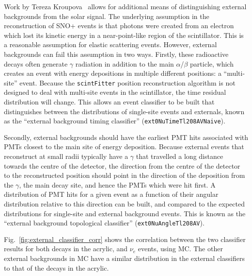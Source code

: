 Work by Tereza Kroupova~\cite{kroupovaImprovingSensitivityNeutrinoless2020} %
allows for additional means of distinguishing external backgrounds from the solar signal. The underlying assumption in the reconstruction of SNO+ events is that photons were created from an electron which lost its kinetic energy in a near-point-like region of the scintillator. This is a reasonable assumption for \beight{} elastic scattering events. However, external backgrounds can fail this assumption in two ways. Firstly, these radioactive decays often generate $\gamma$ radiation in addition to the main $\alpha$/$\beta$ particle, which creates an event with energy depositions in multiple different positions: a ``multi-site'' event. Because the \texttt{scintFitter} position reconstruction algorithm is not designed to deal with multi-site events in the scintillator, the time residual distribution will change. This allows an event classifier to be built that distinguishes between the \tres{} distributions of single-site events and externals, known as the ``external background timing classifier'' (\texttt{ext0NuTimeTl208AVNaive}).

Secondly, external backgrounds should have the earliest PMT hits associated with PMTs closest to the main site of energy deposition. Because external events that reconstruct at small radii typically have a $\gamma$ that travelled a long distance towards the centre of the detector, the direction from the centre of the detector to the reconstructed position should point in the direction of the deposition from the $\gamma$, the main decay site, and hence the PMTs which were hit first. A distribution of PMT hits for a given event as a function of their angular distribution relative to this direction can be built, and compared to the expected distributions for single-site and external background events. This is known as the ``external background topological classifier'' (\texttt{ext0NuAngleTl208AV}).

Fig.~\ref{fig:external_classifier_corr} shows the correlation between the two classifier results for both  decays in the acrylic, and \beight{} $\nu_{e}$ events, using MC. The other external backgrounds in MC have a similar distribution in the external classifiers to that of the  decays in the acrylic.

